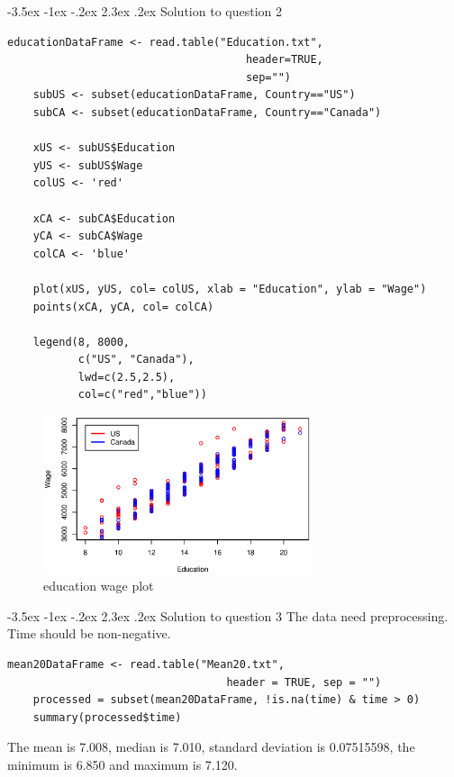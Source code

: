 \documentclass[12pt]{article}
\makeatletter
\renewcommand\section{\@startsection {section}{1}{\z@}%
	{-3.5ex \@plus -1ex \@minus -.2ex}%
	{2.3ex \@plus.2ex}%
	{\normalfont\large\bfseries}}%
\makeatother
\begin{document}
	\section{Solution to question 2}
	\lstset{language=R}
	\lstset{frame=lines}
	\lstset{basicstyle=\footnotesize\ttfamily}
	\begin{lstlisting}[breaklines=true]
	educationDataFrame <- read.table("Education.txt", 
	                                 header=TRUE, 
	                                 sep="")
	subUS <- subset(educationDataFrame, Country=="US")
	subCA <- subset(educationDataFrame, Country=="Canada")
	
	xUS <- subUS$Education
	yUS <- subUS$Wage
	colUS <- 'red'
	
	xCA <- subCA$Education
	yCA <- subCA$Wage
	colCA <- 'blue'
	
	plot(xUS, yUS, col= colUS, xlab = "Education", ylab = "Wage")
	points(xCA, yCA, col= colCA)
	
	legend(8, 8000, 
	       c("US", "Canada"), 
	       lwd=c(2.5,2.5), 
	       col=c("red","blue"))
	\end{lstlisting}
	
	\begin{figure}[htbp]
		\centering
		\includegraphics[width=0.7\textwidth]{figure2.eps}
		\caption{education wage plot}
	\end{figure}
\newpage
	\section{Solution to question 3}
	The data need preprocessing. Time should be non-negative.\\
	\lstset{language=R}
	\lstset{frame=lines}
	\lstset{basicstyle=\footnotesize\ttfamily}
	\begin{lstlisting}[breaklines=true]
	mean20DataFrame <- read.table("Mean20.txt", 
	                              header = TRUE, sep = "")
	processed = subset(mean20DataFrame, !is.na(time) & time > 0) 
	summary(processed$time)
	\end{lstlisting}
	\noindent
	The mean is 7.008, median is 7.010, standard deviation is 0.07515598, the minimum is 6.850 and maximum is 7.120.\\
\end{document}
